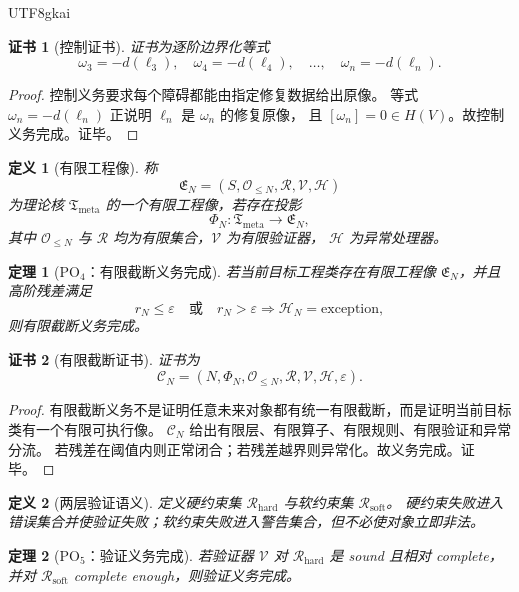 \documentclass[12pt]{article}
\newtheorem{definition}{定义}[section]
\newtheorem{theorem}{定理}[section]
\newtheorem{Certificate}{证书}[section]
\newcommand{\Layer}{\ell}
\begin{document}
\begin{CJK*}{UTF8}{gkai}
\begin{Certificate}[控制证书]
证书为逐阶边界化等式
\[
  \omega_3=-d(\Layer_3),\quad
  \omega_4=-d(\Layer_4),\quad\dots,\quad
  \omega_n=-d(\Layer_n).
\]
\end{Certificate}

\begin{proof}
控制义务要求每个障碍都能由指定修复数据给出原像。
等式 $\omega_n=-d(\Layer_n)$ 正说明 $\Layer_n$ 是 $\omega_n$ 的修复原像，
且 $[\omega_n]=0\in H(V)$。故控制义务完成。证毕。
\end{proof}

\begin{definition}[有限工程像]
\label{def:tex50-finite-engineering-image}
称
\[
  \mathfrak E_N=(S,\mathcal O_{\le N},\mathcal R,\mathcal V,\mathcal H)
\]
为理论核 $\mathfrak T_{\mathrm{meta}}$ 的一个有限工程像，若存在投影
\[
  \Phi_N:\mathfrak T_{\mathrm{meta}}\to\mathfrak E_N,
\]
其中 $\mathcal O_{\le N}$ 与 $\mathcal R$ 均为有限集合，$\mathcal V$ 为有限验证器，
$\mathcal H$ 为异常处理器。
\end{definition}

\begin{theorem}[\(\mathrm{PO}_4\)：有限截断义务完成]
\label{thm:tex50-po4}
若当前目标工程类存在有限工程像 $\mathfrak E_N$，并且高阶残差满足
\[
  r_N\le\varepsilon
  \quad\text{或}\quad
  r_N>\varepsilon\Rightarrow\mathcal H_N=\mathrm{exception},
\]
则有限截断义务完成。
\end{theorem}

\begin{Certificate}[有限截断证书]
证书为
\[
  \mathcal C_N=(N,\Phi_N,\mathcal O_{\le N},\mathcal R,\mathcal V,\mathcal H,\varepsilon).
\]
\end{Certificate}

\begin{proof}
有限截断义务不是证明任意未来对象都有统一有限截断，而是证明当前目标类有一个有限可执行像。
$\mathcal C_N$ 给出有限层、有限算子、有限规则、有限验证和异常分流。
若残差在阈值内则正常闭合；若残差越界则异常化。故义务完成。证毕。
\end{proof}

\begin{definition}[两层验证语义]
\label{def:tex50-two-level-validation}
定义硬约束集 $\mathcal R_{\mathrm{hard}}$ 与软约束集 $\mathcal R_{\mathrm{soft}}$。
硬约束失败进入错误集合并使验证失败；软约束失败进入警告集合，但不必使对象立即非法。
\end{definition}

\begin{theorem}[\(\mathrm{PO}_5\)：验证义务完成]
\label{thm:tex50-po5}
若验证器 $\mathcal V$ 对 $\mathcal R_{\mathrm{hard}}$ 是 sound 且相对 complete，
并对 $\mathcal R_{\mathrm{soft}}$ complete enough，则验证义务完成。
\end{theorem}


\end{CJK*}
\end{document}

